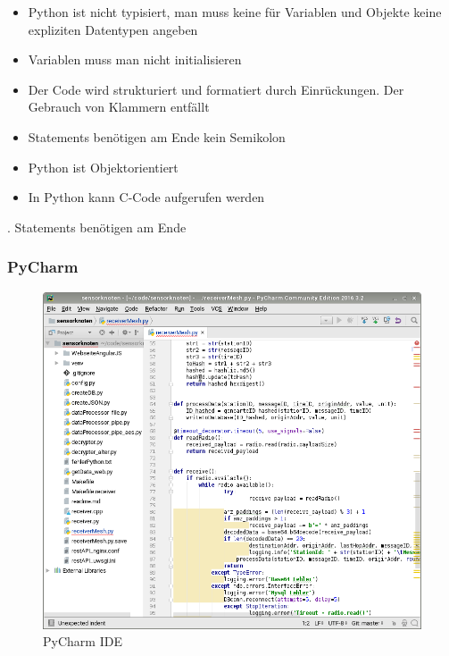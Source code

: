 \begin{itemize}
\item Python ist nicht typisiert, man muss keine für Variablen und Objekte keine expliziten Datentypen angeben
\item Variablen muss man nicht initialisieren
\item Der Code wird strukturiert und formatiert durch Einrückungen. Der Gebrauch von Klammern entfällt
\item Statements benötigen am Ende kein Semikolon
\item Python ist Objektorientiert
\item In Python kann C-Code aufgerufen werden
\end{itemize} . Statements benötigen am Ende 





\subsubsection{PyCharm} 
\begin{figure}
\includegraphics[scale=0.5]{bilder/pycharm} 
\caption{PyCharm IDE}
\label{PyCharm}
\end{figure}
  

